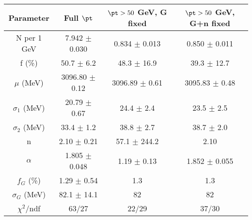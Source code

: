 \begin{tabular}{c||c|c|c}
Parameter & Full $\pt$ & $\pt>50$ GeV, G fixed & $\pt>50$ GeV, G+n fixed \\
\hline
N per 1 GeV & 7.942 $\pm$ 0.030 & 0.834 $\pm$ 0.013 & 0.850 $\pm$ 0.011\\
f (\%) & 50.7 $\pm$ 6.2 & 48.3 $\pm$ 16.9 & 39.3 $\pm$ 12.7\\
$\mu$ (MeV) & 3096.80 $\pm$ 0.12 & 3096.89 $\pm$ 0.61 & 3095.83 $\pm$ 0.48\\
$\sigma_1$ (MeV) & 20.79 $\pm$ 0.67 & 24.4 $\pm$ 2.4 & 23.5 $\pm$ 2.5\\
$\sigma_2$ (MeV) & 33.4 $\pm$ 1.2 & 38.8 $\pm$ 2.7 & 38.7 $\pm$ 2.0\\
n & 2.10 $\pm$ 0.21 & 57.1 $\pm$ 244.2 & 2.10\\
$\alpha$ & 1.805 $\pm$ 0.048 & 1.19 $\pm$ 0.13 & 1.852 $\pm$ 0.055\\
$f_G$ (\%) & 1.29 $\pm$ 0.54 & 1.3 & 1.3\\
$\sigma_G$ (MeV) & 82.1 $\pm$ 14.1 & 82 & 82\\
\hline
$\chi^2$/ndf & 63/27 & 22/29 & 37/30\\
\end{tabular}
